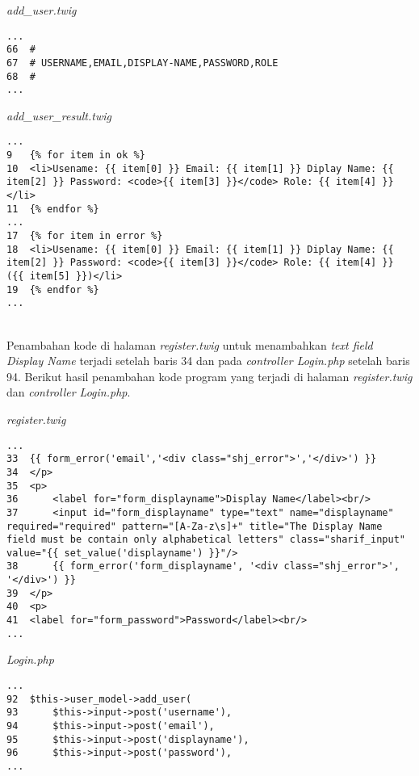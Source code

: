 \textit{add\_user.twig}
\begin{lstlisting}[basicstyle=\ttfamily, frame=single,
columns=fullflexible, keepspaces=true, breaklines=true]
...
66	#
67	# USERNAME,EMAIL,DISPLAY-NAME,PASSWORD,ROLE
68	#
...
\end{lstlisting}

\textit{add\_user\_result.twig}
\begin{lstlisting}[basicstyle=\ttfamily, frame=single,
columns=fullflexible, keepspaces=true, breaklines=true]
...
9	{% for item in ok %}
10	<li>Usename: {{ item[0] }} Email: {{ item[1] }} Diplay Name: {{ item[2] }} Password: <code>{{ item[3] }}</code> Role: {{ item[4] }} </li>
11	{% endfor %}
...
17	{% for item in error %}
18	<li>Usename: {{ item[0] }} Email: {{ item[1] }} Diplay Name: {{ item[2] }} Password: <code>{{ item[3] }}</code> Role: {{ item[4] }} ({{ item[5] }})</li>
19	{% endfor %}
...
\end{lstlisting}
~\\
Penambahan kode di halaman \textit{register.twig} untuk menambahkan \textit{text field Display Name} terjadi setelah baris 34 dan pada \textit{controller Login.php} setelah baris 94. Berikut hasil penambahan kode program yang terjadi di halaman \textit{register.twig} dan \textit{controller Login.php}.

\textit{register.twig}
\begin{lstlisting}[basicstyle=\ttfamily, frame=single,
columns=fullflexible, keepspaces=true, breaklines=true]
...
33	{{ form_error('email','<div class="shj_error">','</div>') }}
34	</p>
35	<p>
36		<label for="form_displayname">Display Name</label><br/>
37		<input id="form_displayname" type="text" name="displayname" required="required" pattern="[A-Za-z\s]+" title="The Display Name field must be contain only alphabetical letters" class="sharif_input" value="{{ set_value('displayname') }}"/>
38		{{ form_error('form_displayname', '<div class="shj_error">', '</div>') }}
39	</p>
40	<p>
41	<label for="form_password">Password</label><br/>
...
\end{lstlisting}

\textit{Login.php}
\begin{lstlisting}[basicstyle=\ttfamily, frame=single,
columns=fullflexible, keepspaces=true, breaklines=true]
...
92	$this->user_model->add_user(
93		$this->input->post('username'),
94		$this->input->post('email'),
95		$this->input->post('displayname'),
96		$this->input->post('password'),
...
\end{lstlisting}


